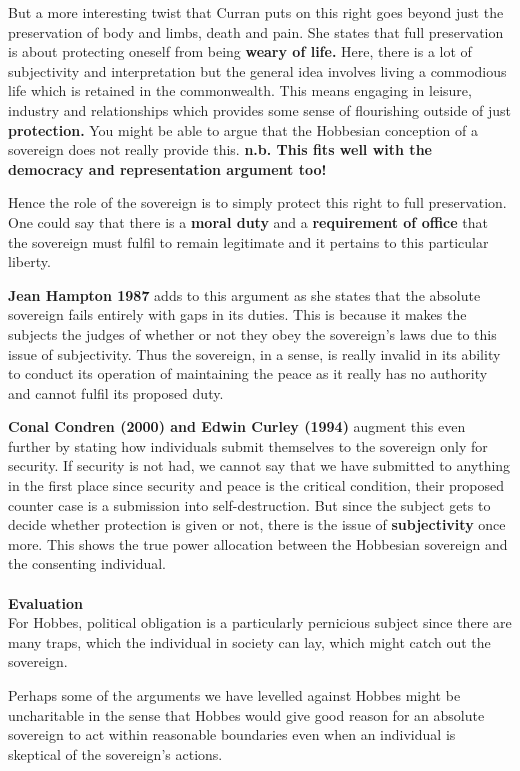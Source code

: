 \documentclass[12pt, letterpaper]{article}
\begin{document}
But a more interesting twist that Curran puts on this right goes beyond just the preservation of body and limbs, death and pain. She states that full preservation is about protecting oneself from being \textbf{weary of life.} Here, there is a lot of subjectivity and interpretation but the general idea involves living a commodious life which is retained in the commonwealth. This means engaging in leisure, industry and relationships which provides some sense of flourishing outside of just \textbf{protection.} You might be able to argue that the Hobbesian conception of a sovereign does not really provide this. \textbf{n.b. This fits well with the democracy and representation argument too!}

Hence the role of the sovereign is to simply protect this right to full preservation. One could say that there is a \textbf{moral duty} and a \textbf{requirement of office} that the sovereign must fulfil to remain legitimate and it pertains to this particular liberty.

\textbf{Jean Hampton 1987} adds to this argument as she states that the absolute sovereign fails entirely with gaps in its duties. This is because it makes the subjects the judges of whether or not they obey the sovereign's laws due to this issue of subjectivity. Thus the sovereign, in a sense, is really invalid in its ability to conduct its operation of maintaining the peace as it really has no authority and cannot fulfil its proposed duty.

\textbf{Conal Condren (2000) and Edwin Curley (1994)} augment this even further by stating how individuals submit themselves to the sovereign only for security. If security is not had, we cannot say that we have submitted to anything in the first place since security and peace is the critical condition, their proposed counter case is a submission into self-destruction. But since the subject gets to decide whether protection is given or not, there is the issue of \textbf{subjectivity} once more. This shows the true power allocation between the Hobbesian sovereign and the consenting individual.\\\\
\textbf{Evaluation}\\
For Hobbes, political obligation is a particularly pernicious subject since there are many traps, which the individual in society can lay, which might catch out the sovereign.

Perhaps some of the arguments we have levelled against Hobbes might be uncharitable in the sense that Hobbes would give good reason for an absolute sovereign to act within reasonable boundaries even when an individual is skeptical of the sovereign's actions.
\end{document}
